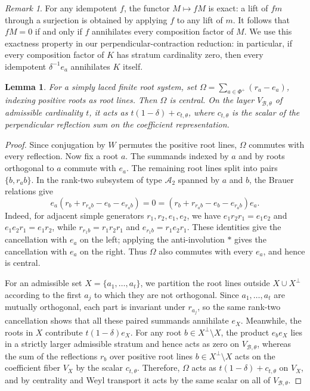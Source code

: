 \documentclass[11pt,a4paper]{amsart}
\newtheorem{lemma}[theorem]{Lemma}
\theoremstyle{uprightdefinition}
\theoremstyle{remark}\newtheorem{remark}[theorem]{Remark}
\begin{document}
\begin{remark}
For any idempotent $f$, the functor $M\mapsto fM$ is exact: a lift of
$fm$ through a surjection is obtained by applying $f$ to any lift of $m$.
It follows that $fM=0$ if and only if $f$ annihilates every composition
factor of $M$. We use this exactness property in our perpendicular-contraction reduction: in particular, if every composition factor of $K$
has stratum cardinality zero, then every idempotent $\delta^{-1}e_a$ annihilates $K$ itself.
\end{remark}


\begin{lemma}
\label{lem:central-collision}
For a simply laced finite root system, set
$\Omega=\sum_{a\in\Phi^+}(r_a-e_a)$, indexing positive roots as root lines.
Then $\Omega$ is central. On the layer $V_{\mathcal B,\theta}$ of
admissible cardinality $t$, it acts as
$t(1-\delta)+c_{t,\theta}$, where $c_{t,\theta}$ is the scalar of the
perpendicular reflection sum on the coefficient representation.
\end{lemma}
\begin{proof}
Since conjugation by $W$ permutes the positive root lines, $\Omega$ commutes with every
reflection. Now fix a root $a$. The summands indexed by $a$ and by roots
orthogonal to $a$ commute with $e_a$. The remaining root lines split
into pairs $\{b,r_a b\}$. In the rank-two subsystem of type $\mathscr{A}_2$ spanned by $a$ and $b$, the
Brauer relations give
\[
 e_a(r_b+r_{r_a b}-e_b-e_{r_a b})=0
 =(r_b+r_{r_a b}-e_b-e_{r_a b})e_a.
\]
Indeed, for adjacent simple generators $r_1,r_2,e_1,e_2$, we have
$e_1r_2r_1=e_1e_2$ and $e_1e_2r_1=e_1r_2$, while
$r_{r_1b}=r_1r_2r_1$ and $e_{r_1b}=r_1e_2r_1$.
These identities give the cancellation with $e_a$ on the left; applying
the anti-involution $*$ gives the cancellation with $e_a$ on the right. Thus $\Omega$ also commutes with every
$e_a$, and hence is central.

For an admissible set $X=\{a_1,\ldots,a_t\}$, we partition the root lines
outside $X\cup X^\perp$ according to the first $a_j$ to which they
are not orthogonal. Since $a_1,\ldots,a_t$ are mutually orthogonal, each part is invariant under $r_{a_j}$, so the same rank-two cancellation shows
that all these paired summands annihilate $e_X$.
Meanwhile, the roots in $X$ contribute $t(1-\delta)e_X$.
For any root $b\in X^\perp\setminus X$, the product
$e_b e_X$ lies in a strictly larger admissible stratum and hence
acts as zero on $V_{\mathcal B,\theta}$, whereas the sum of the reflections $r_b$ over positive root lines
$b\in X^\perp\setminus X$ acts on the coefficient fiber $V_X$ by the scalar $c_{t,\theta}$. Therefore, $\Omega$ acts as $t(1-\delta)+c_{t,\theta}$ on $V_X$, and by centrality and Weyl transport it acts by the same scalar on all of $V_{\mathcal B,\theta}$.
\end{proof}
\end{document}

